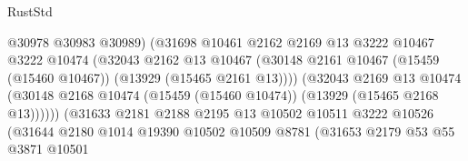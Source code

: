 \begin{lexlean}{RustStd}
\begin{coremodule}
                                          @30978
                                          @30983
                                          @30989)
                                        (@31698
                                          @10461
                                          @2162
                                          @2169
                                          @13
                                          @3222
                                          @10467
                                          @3222
                                          @10474
                                          (@32043
                                            @2162
                                            @13
                                            @10467
                                            (@30148
                                              @2161
                                              @10467
                                              (@15459 (@15460 @10467))
                                              (@13929 (@15465 @2161 @13))))
                                          (@32043
                                            @2169
                                            @13
                                            @10474
                                            (@30148
                                              @2168
                                              @10474
                                              (@15459 (@15460 @10474))
                                              (@13929 (@15465 @2168 @13))))))
                                      (@31633
                                        @2181
                                        @2188
                                        @2195
                                        @13
                                        @10502
                                        @10511
                                        @3222
                                        @10526
                                        (@31644
                                          @2180
                                          @1014
                                          @19390
                                          @10502
                                          @10509
                                          @8781
                                          (@31653
                                            @2179
                                            @53
                                            @55
                                            @3871
                                            @10501

\end{coremodule}
\end{lexlean}
